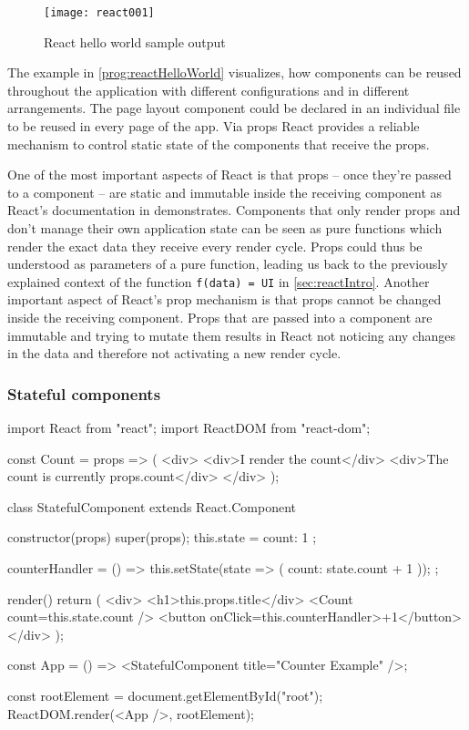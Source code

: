 \begin{figure}
  \centering
  \texttt{[image: react001]}
  \caption{React hello world sample output}
  \label{fig:reactHelloWorld}
\end{figure}

The example in \ref{prog:reactHelloWorld} visualizes, how components can be reused throughout the application with different configurations and in different arrangements. The page layout component could be declared in an individual file to be reused in every page of the app. Via props React provides a reliable mechanism to control static state of the components that receive the props.

One of the most important aspects of React is that props -- once they're passed to a component -- are static and immutable inside the receiving component as React's documentation in \cite[/docs/components-and-props.html\#props-are-read-only]{React} demonstrates. Components that only render props and don't manage their own application state can be seen as pure functions which render the exact data they receive every render cycle. Props could thus be understood as parameters of a pure function, leading us back to the previously explained context of the function \texttt{f(data) = UI} in \ref{sec:reactIntro}. Another important aspect of React's prop mechanism is that props cannot be changed inside the receiving component. Props that are passed into a component are immutable and trying to mutate them results in React not noticing any changes in the data and therefore not activating a new render cycle.

\subsubsection{Stateful components}

\begin{program}
\caption{Simple example of a React component and its usage} 
\label{prog:reactStateful}
\begin{JsCode}
import React from "react";
import ReactDOM from "react-dom";

const Count = props => (
  <div>
    <div>I render the count</div>
    <div>The count is currently {props.count}</div>
  </div>
);

class StatefulComponent extends React.Component {
  constructor(props) {
    super(props);
    this.state = {
      count: 1
    };
  }

  counterHandler = () => {
    this.setState(state => ({ count: state.count + 1 }));
  };

  render() {
    return (
      <div>
        <h1>{this.props.title}</div>
        <Count count={this.state.count} />
        <button onClick={this.counterHandler}>+1</button>
      </div>
    );
  }
}

const App = () => <StatefulComponent title={"Counter Example"} />;

const rootElement = document.getElementById("root");
ReactDOM.render(<App />, rootElement);
\end{JsCode}
\end{program}

